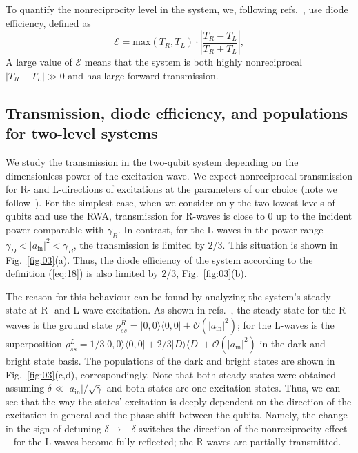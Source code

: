 \documentclass[lettersize,journal]{IEEEtran}
\begin{document}
To quantify the nonreciprocity level in the system, we, following refs.~\cite{dai_rectification_2015,muller_nonreciprocal_2017,rosario_hamann_nonreciprocity_2018}, use diode efficiency, defined as
\begin{equation}\label{eq:18}
    \mathcal{E} = \mathrm{max}(T_{R}, T_{L}) \cdot \left|\frac{T_{R} - T_{L}}{T_R + T_L}\right|,
\end{equation}
A large value of $\mathcal{E}$ means that the system is both highly nonreciprocal $|T_{R} - T_{L}| \gg 0$ and has large forward transmission. 

\subsection{Transmission, diode efficiency, and populations for two-level systems}

We study the transmission in the two-qubit system depending on the dimensionless power of the excitation wave.
We expect nonreciprocal transmission for R- and L-directions of excitations at the parameters of our choice (note we follow~\cite{rosario_hamann_nonreciprocity_2018}).
For the simplest case, when we consider only the two lowest levels of qubits and use the RWA, transmission for R-waves is close to 0 up to the incident power comparable with $\gamma_B$. 
In contrast, for the L-waves in the power range $\gamma_D<|a_\mathrm{in}|^2 < \gamma_B$, the transmission is limited by $2/3$.
This situation is shown in Fig.~\ref{fig:03}(a).
Thus, the diode efficiency of the system according to the definition (\ref{eq:18}) is also limited by $2/3$, Fig.~\ref{fig:03}(b).

The reason for this behaviour can be found by analyzing the system's steady state at R- and L-wave excitation.
As shown in refs.~\cite{muller_nonreciprocal_2017, rosario_hamann_rectangular_2019, Nefedkin2022}, the steady state for the R-waves is the ground state $\rho_{ss}^R = |0,0\rangle \langle0,0| + \mathcal{O}(|a_\mathrm{in}|^2)$; for the L-waves is the superposition $\rho_{ss}^L = 1/3 |0,0\rangle \langle0,0| + 2/3 |D \rangle \langle D| + \mathcal{O}(|a_\mathrm{in}|^2)$ in the dark and bright state basis.
The populations of the dark and bright states are shown in Fig.~\ref{fig:03}(c,d), correspondingly.
Note that both steady states were obtained assuming $\delta \ll |a_\mathrm{in}|/\sqrt{\bar{\gamma}}$ and both states are one-excitation states.
Thus, we can see that the way the states' excitation is deeply dependent on the direction of the excitation in general and the phase shift between the qubits.
Namely, the change in the sign of detuning $\delta \rightarrow - \delta$ switches the direction of the nonreciprocity effect -- for the L-waves become fully reflected; the R-waves are partially transmitted.
\end{document}
